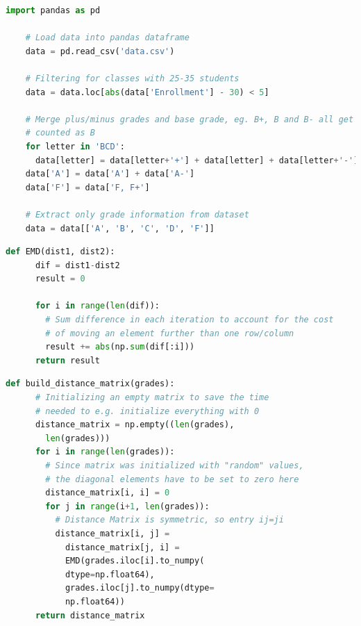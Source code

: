 \documentclass[12pt,letterpaper,oneside,openany]{book}
\begin{document}
\begin{minipage}{\linewidth}
	\begin{lstlisting}[language=Python, caption={Examples for CRUD operations in Python using \code{pandas}}, label={lst:pypd}, captionpos=b]
	import pandas as pd
	
	# Load data into pandas dataframe
	data = pd.read_csv('data.csv')
	
	# Filtering for classes with 25-35 students
	data = data.loc[abs(data['Enrollment'] - 30) < 5]
	
	# Merge plus/minus grades and base grade, eg. B+, B and B- all get 
	# counted as B
	for letter in 'BCD':
	  data[letter] = data[letter+'+'] + data[letter] + data[letter+'-']
	data['A'] = data['A'] + data['A-']
	data['F'] = data['F, F+']
	
	# Extract only grade information from dataset
	data = data[['A', 'B', 'C', 'D', 'F']]
	\end{lstlisting}
\end{minipage}



\begin{minipage}{\linewidth}
	\begin{lstlisting}[language=Python, caption={Python code to compute the absolute EMD of two distributions}, label={lst:pyemd}, captionpos=b]
	def EMD(dist1, dist2):
	  dif = dist1-dist2
	  result = 0
	
	  for i in range(len(dif)):
	    # Sum difference in each iteration to account for the cost
	    # of moving an element further than one row/column
 	    result += abs(np.sum(dif[:i]))
	  return result
	\end{lstlisting}
\end{minipage}




\begin{minipage}{\linewidth}
	\begin{lstlisting}[language=Python, caption={Python code to compute the distance matrix of  a set of grade distributions, given as a pandas Series object}, label={lst:pydm}, captionpos=b]
	def build_distance_matrix(grades):
	  # Initializing an empty matrix to save the time
	  # needed to e.g. initialize everything with 0
	  distance_matrix = np.empty((len(grades), 
	    len(grades)))
	  for i in range(len(grades)):
	    # Since matrix was initialized with "random" values, 
	    # the diagonal elements have to be set to zero here
	    distance_matrix[i, i] = 0
	    for j in range(i+1, len(grades)):
	      # Distance Matrix is symmetric, so entry ij=ji
	      distance_matrix[i, j] =
	        distance_matrix[j, i] =
	        EMD(grades.iloc[i].to_numpy(
	        dtype=np.float64),
	        grades.iloc[j].to_numpy(dtype=
	        np.float64))
	  return distance_matrix
	\end{lstlisting}
\end{minipage}
\end{document}
